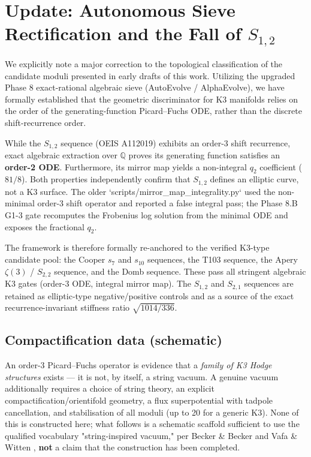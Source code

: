 \documentclass[11pt,a4paper]{article}
\begin{document}
\section*{Update: Autonomous Sieve Rectification and the Fall of $S_{1,2}$}\label{sec:update}

We explicitly note a major correction to the topological classification of the candidate moduli presented in early drafts of this work. Utilizing the upgraded Phase 8 exact-rational algebraic sieve (AutoEvolve / AlphaEvolve), we have formally established that the geometric discriminator for K3 manifolds relies on the order of the generating-function Picard--Fuchs ODE, rather than the discrete shift-recurrence order.

While the $S_{1,2}$ sequence (OEIS A112019) exhibits an order-3 shift recurrence, exact algebraic extraction over $\mathbb{Q}$ proves its generating function satisfies an \textbf{order-2 ODE}. Furthermore, its mirror map yields a non-integral $q_2$ coefficient ($81/8$). Both properties independently confirm that $S_{1,2}$ defines an elliptic curve, not a K3 surface. The older `scripts/mirror\_map\_integrality.py` used the non-minimal order-3 shift operator and reported a false integral pass; the Phase 8.B G1-3 gate recomputes the Frobenius log solution from the minimal ODE and exposes the fractional $q_2$.

The framework is therefore formally re-anchored to the verified K3-type candidate pool: the Cooper $s_7$ and $s_{10}$ sequences, the T103 sequence, the Apery $\zeta(3)$ / $S_{2,2}$ sequence, and the Domb sequence. These pass all stringent algebraic K3 gates (order-3 ODE, integral mirror map). The $S_{1,2}$ and $S_{2,1}$ sequences are retained as elliptic-type negative/positive controls and as a source of the exact recurrence-invariant stiffness ratio $\sqrt{1014/336}$.

\subsection{Compactification data (schematic)}\label{sec:compactification}
An order-3 Picard–Fuchs operator is evidence that a \emph{family of K3 Hodge structures} exists — it is not, by itself, a string vacuum. A genuine vacuum additionally requires a choice of string theory, an explicit compactification/orientifold geometry, a flux superpotential with tadpole cancellation, and stabilisation of all moduli (up to 20 for a generic K3). None of this is constructed here; what follows is a schematic scaffold sufficient to use the qualified vocabulary "string-inspired vacuum," per Becker \& Becker \cite{becker1995} and Vafa \& Witten \cite{vafa1995}, \textbf{not} a claim that the construction has been completed.
\end{document}
